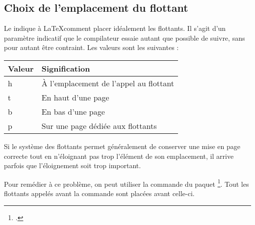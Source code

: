 \subsection{Choix de l'emplacement du flottant}

Le  indique à \LaTeX comment placer idéalement les flottants. Il s'agit d'un paramètre indicatif que le compilateur essaie autant que possible de suivre, sans pour autant être contraint. Les valeurs sont les suivantes :

\begin{longtable}{|l|l|}
	\hline
	Valeur & Signification	\\
	\hline
	\endhead
	\hline
	\endfoot
	h 	& À l'emplacement de l'appel au flottant 	\\
	t 	& En haut d'une page				\\
	b 	& En bas d'une page				\\
	p 	& Sur une page dédiée aux flottants		\\
\end{longtable}


Si le système des flottants permet généralement de conserver une mise en page correcte tout en n'éloignant pas trop l'élément de son emplacement, il arrive parfois que l'éloignement soit trop important.

Pour remédier à ce problème, on peut utiliser la commande  du paquet \footcite{placeins}. 
Tout les flottants appelés avant la commande sont placées avant celle-ci.






	
